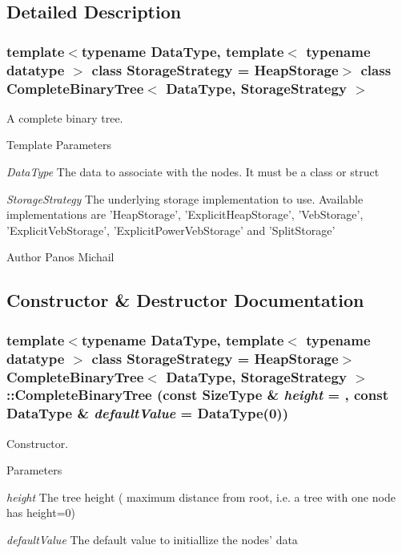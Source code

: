 \subsection{Detailed Description}
\subsubsection*{template$<$typename DataType, template$<$ typename datatype $>$ class StorageStrategy = HeapStorage$>$ class CompleteBinaryTree$<$ DataType, StorageStrategy $>$}

A complete binary tree. 
\begin{DoxyTemplParams}{Template Parameters}
\item[{\em DataType}]The data to associate with the nodes. It must be a class or struct \item[{\em StorageStrategy}]The underlying storage implementation to use. Available implementations are 'HeapStorage', 'ExplicitHeapStorage', 'VebStorage', 'ExplicitVebStorage', 'ExplicitPowerVebStorage' and 'SplitStorage' \end{DoxyTemplParams}
\begin{DoxyAuthor}{Author}
Panos Michail 
\end{DoxyAuthor}


\subsection{Constructor \& Destructor Documentation}
\hypertarget{class_complete_binary_tree_ab29b9b403e94cf4fa13ad62f09709540}{
\subsubsection[{CompleteBinaryTree}]{\setlength{\rightskip}{0pt plus 5cm}template$<$typename DataType, template$<$ typename datatype $>$ class StorageStrategy = HeapStorage$>$ {\bf CompleteBinaryTree}$<$ DataType, StorageStrategy $>$::{\bf CompleteBinaryTree} (const SizeType \& {\em height} = {}, \/  const DataType \& {\em defaultValue} = {\ttfamily DataType(0)})}}
\label{class_complete_binary_tree_ab29b9b403e94cf4fa13ad62f09709540}


Constructor. 


\begin{DoxyParams}{Parameters}
\item[{\em height}]The tree height ( maximum distance from root, i.e. a tree with one node has height=0) \item[{\em defaultValue}]The default value to initiallize the nodes' data \end{DoxyParams}


